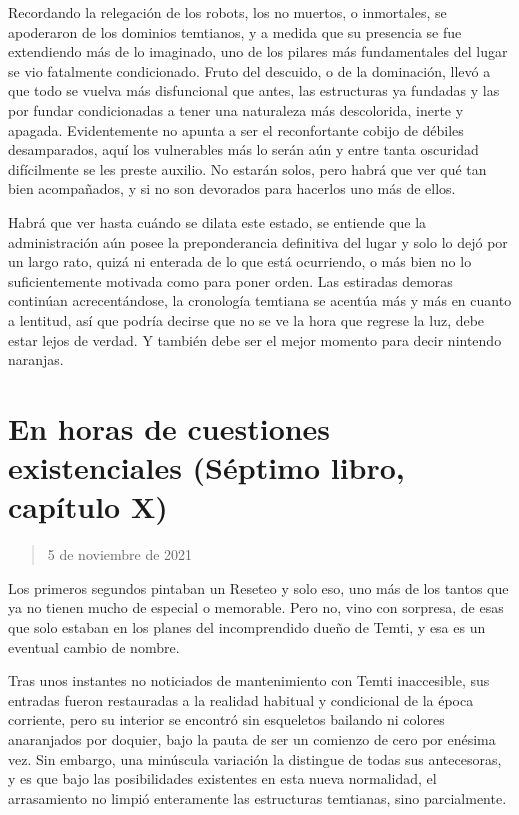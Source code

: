 \documentclass[
]{book}
\begin{document}
Recordando la relegación de los robots, los no muertos, o inmortales, se apoderaron de los dominios temtianos, y a medida que su presencia se fue extendiendo más de lo imaginado, uno de los pilares más fundamentales del lugar se vio fatalmente condicionado. Fruto del descuido, o de la dominación, llevó a que todo se vuelva más disfuncional que antes, las estructuras ya fundadas y las por fundar condicionadas a tener una naturaleza más descolorida, inerte y apagada. Evidentemente no apunta a ser el reconfortante cobijo de débiles desamparados, aquí los vulnerables más lo serán aún y entre tanta oscuridad difícilmente se les preste auxilio. No estarán solos, pero habrá que ver qué tan bien acompañados, y si no son devorados para hacerlos uno más de ellos.

Habrá que ver hasta cuándo se dilata este estado, se entiende que la administración aún posee la preponderancia definitiva del lugar y solo lo dejó por un largo rato, quizá ni enterada de lo que está ocurriendo, o más bien no lo suficientemente motivada como para poner orden. Las estiradas demoras continúan acrecentándose, la cronología temtiana se acentúa más y más en cuanto a lentitud, así que podría decirse que no se ve la hora que regrese la luz, debe estar lejos de verdad. Y también debe ser el mejor momento para decir nintendo naranjas.

\hypertarget{en-horas-de-cuestiones-existenciales-suxe9ptimo-libro-capuxedtulo-x}{%
\section{En horas de cuestiones existenciales (Séptimo libro, capítulo X)}\label{en-horas-de-cuestiones-existenciales-suxe9ptimo-libro-capuxedtulo-x}}

\begin{quote}
5 de noviembre de 2021
\end{quote}

Los primeros segundos pintaban un Reseteo y solo eso, uno más de los tantos que ya no tienen mucho de especial o memorable. Pero no, vino con sorpresa, de esas que solo estaban en los planes del incomprendido dueño de Temti, y esa es un eventual cambio de nombre.

Tras unos instantes no noticiados de mantenimiento con Temti inaccesible, sus entradas fueron restauradas a la realidad habitual y condicional de la época corriente, pero su interior se encontró sin esqueletos bailando ni colores anaranjados por doquier, bajo la pauta de ser un comienzo de cero por enésima vez. Sin embargo, una minúscula variación la distingue de todas sus antecesoras, y es que bajo las posibilidades existentes en esta nueva normalidad, el arrasamiento no limpió enteramente las estructuras temtianas, sino parcialmente.
\end{document}
